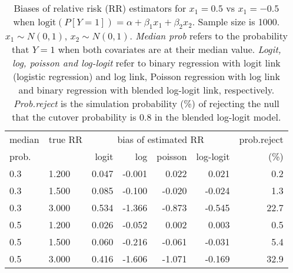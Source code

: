 \documentclass[12pt,a4paper]{article}
\begin{document}
\begin{table}[H] 
\small\sf\centering 
\caption{Biases of relative risk (RR) estimators for $x_1=0.5$ vs $x_1=-0.5$ when $\mbox{logit}(P[Y=1])=\alpha+\beta_1 x_1 + \beta_2 x_2$. Sample size is 1000. $x_1 \sim $$N(0,1)$, $x_2 \sim N(0,1)$. {\it Median prob} refers to the probability that $Y=1$ when both covariates are at their median value. {\it Logit, log, poisson and log-logit} refer to binary regression with logit link (logistic regression) and log link, Poisson regression with log link and binary regression with blended log-logit link, respectively. {\it Prob.reject} is the simulation probability (\%) of rejecting the null that the cutover probability is $0.8$ in the blended log-logit model.} 
\begin{tabular}{llrrrrr} 
\toprule 
median & true RR & \multicolumn{4}{c}{bias of estimated RR} & prob.reject \\ 
prob. & & logit & log & poisson & log-logit  & (\%) \\ \midrule 
0.3 & 1.200 & 0.047 & -0.001 &  0.022 &  0.021 &  0.2 \\  
0.3 & 1.500 & 0.085 & -0.100 & -0.020 & -0.024 &  1.3 \\  
0.3 & 3.000 & 0.534 & -1.366 & -0.873 & -0.545 & 22.7 \\  
0.5 & 1.200 & 0.026 & -0.052 &  0.002 &  0.003 &  0.5 \\  
0.5 & 1.500 & 0.060 & -0.216 & -0.061 & -0.031 &  5.4 \\  
0.5 & 3.000 & 0.416 & -1.606 & -1.071 & -0.169 & 32.9 \\  
\bottomrule 
\end{tabular} 
\end{table} 
\end{document}
